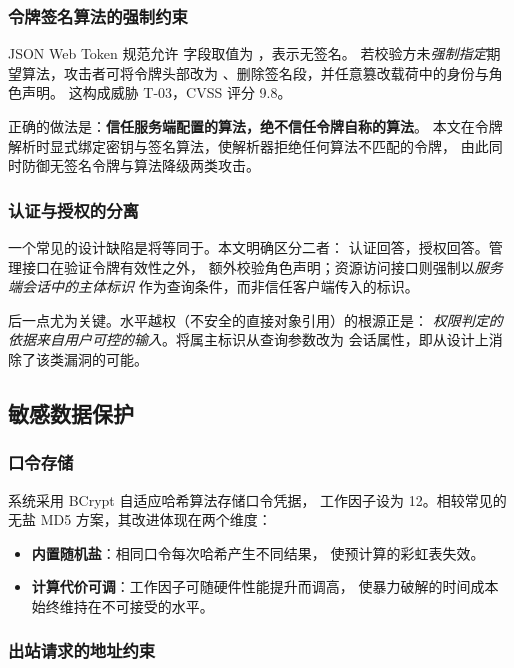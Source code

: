 \subsubsection{令牌签名算法的强制约束}

JSON Web Token 规范允许  字段取值为 ，表示无签名。
若校验方未\emph{强制指定}期望算法，攻击者可将令牌头部改为
、删除签名段，并任意篡改载荷中的身份与角色声明。
这构成威胁 T-03，CVSS 评分 9.8。

正确的做法是：\textbf{信任服务端配置的算法，绝不信任令牌自称的算法}。
本文在令牌解析时显式绑定密钥与签名算法，使解析器拒绝任何算法不匹配的令牌，
由此同时防御无签名令牌与算法降级两类攻击。

\subsubsection{认证与授权的分离}

一个常见的设计缺陷是将等同于。本文明确区分二者：
认证回答，授权回答。管理接口在验证令牌有效性之外，
额外校验角色声明；资源访问接口则强制以\emph{服务端会话中的主体标识}
作为查询条件，而非信任客户端传入的标识。

后一点尤为关键。水平越权（不安全的直接对象引用）的根源正是：
\emph{权限判定的依据来自用户可控的输入}。将属主标识从查询参数改为
会话属性，即从设计上消除了该类漏洞的可能。

\subsection{敏感数据保护}

\subsubsection{口令存储}

系统采用 BCrypt 自适应哈希算法存储口令凭据\cite{provos2003bcrypt}，
工作因子设为 12。相较常见的无盐 MD5 方案，其改进体现在两个维度：

\begin{itemize}
  \item \textbf{内置随机盐}：相同口令每次哈希产生不同结果，
        使预计算的彩虹表失效。
  \item \textbf{计算代价可调}：工作因子可随硬件性能提升而调高，
        使暴力破解的时间成本始终维持在不可接受的水平。
\end{itemize}

\subsubsection{出站请求的地址约束}

